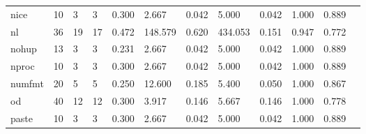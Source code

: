 \begin{longtable}{lp{1.00cm}p{1.00cm}p{1.00cm}p{1.00cm}p{1.00cm}p{1.00cm}p{1.00cm}p{1.00cm}p{1.00cm}p{1.00cm}p{1.00cm}}
nice      &                           10 &                  3 &                                 3 &                                      0.300 &                                  2.667 &                                        0.042 &                             5.000 &                                   0.042 &                        1.000 &                                        0.889 \\
nl        &                           36 &                 19 &                                17 &                                      0.472 &                                148.579 &                                        0.620 &                           434.053 &                                   0.151 &                        0.947 &                                        0.772 \\
nohup     &                           13 &                  3 &                                 3 &                                      0.231 &                                  2.667 &                                        0.042 &                             5.000 &                                   0.042 &                        1.000 &                                        0.889 \\
nproc     &                           10 &                  3 &                                 3 &                                      0.300 &                                  2.667 &                                        0.042 &                             5.000 &                                   0.042 &                        1.000 &                                        0.889 \\
numfmt    &                           20 &                  5 &                                 5 &                                      0.250 &                                 12.600 &                                        0.185 &                             5.400 &                                   0.050 &                        1.000 &                                        0.867 \\
od        &                           40 &                 12 &                                12 &                                      0.300 &                                  3.917 &                                        0.146 &                             5.667 &                                   0.146 &                        1.000 &                                        0.778 \\
paste     &                           10 &                  3 &                                 3 &                                      0.300 &                                  2.667 &                                        0.042 &                             5.000 &                                   0.042 &                        1.000 &                                        0.889 \\

\end{longtable}
